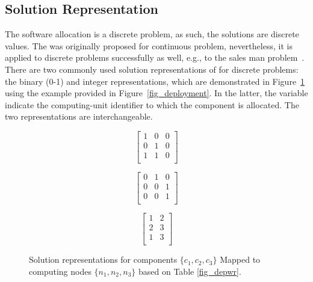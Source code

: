 \subsection{Solution Representation}
The software allocation is a discrete problem, as such, the solutions are discrete values. The \pso{} was originally proposed for continuous problem, nevertheless, it is applied to discrete problems successfully as well, e.g., to the sales man problem~\cite{Clerc2000DiscreteProblem}. There are two commonly used solution representations of \pso{} for discrete problems: the binary (0-1) and integer representations, which are demonstrated in Figure~\ref{fig_solutionrep} using the example provided in Figure~\ref{fig_deployment}. In the latter, the variable indicate the computing-unit identifier to which the component is allocated. The two representations are interchangeable.
\begin{figure}
	\centering
		\begin{minipage}{.5\textwidth}
		\centering
				\begin{minipage}{.3\textwidth}
				\centering
				\begin{equation*}
				\begin{bmatrix} 
				1 & 0& 0\\
				0 & 1& 0\\
				1 &  1& 0\\
				\end{bmatrix}
				\end{equation*}
			\end{minipage}%
			\begin{minipage}{.3\textwidth}
				\centering
				\begin{equation*}
				\begin{bmatrix} 
				0 & 1& 0\\
				0 & 0& 1\\
				0 &  0& 1\\
				\end{bmatrix}
				\end{equation*}
			\end{minipage}
		\label{fig_binary}
	\end{minipage}
	\begin{minipage}{.4\textwidth}
		\centering
		\begin{equation*}
		\begin{bmatrix} 
		1 & 2\\
		2& 3\\
		1& 3\\
		\end{bmatrix}
		\end{equation*}
		\label{fig_integer}
	\end{minipage}
		\caption{Solution representations for components $\{c_1,c_2,c_3\}$ Mapped to computing nodes $\{n_1,n_2,n_3\}$ based on Table \ref{fig_depwr}.}
		\label{fig_solutionrep}
\end{figure}

